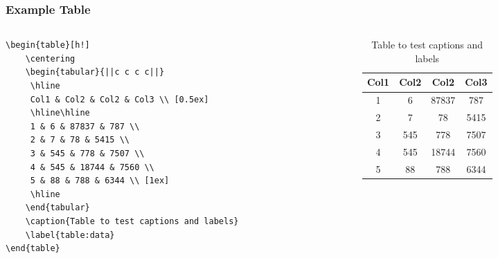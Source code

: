 \documentclass[aspectratio=169]{beamer}
\begin{document}
\begin{frame}[fragile]
\frametitle{Example Table}
    \begin{columns}
        \tiny
        \begin{column}{0.5\textwidth}
            \begin{verbatim}
\begin{table}[h!]
    \centering
    \begin{tabular}{||c c c c||} 
     \hline
     Col1 & Col2 & Col2 & Col3 \\ [0.5ex] 
     \hline\hline
     1 & 6 & 87837 & 787 \\ 
     2 & 7 & 78 & 5415 \\
     3 & 545 & 778 & 7507 \\
     4 & 545 & 18744 & 7560 \\
     5 & 88 & 788 & 6344 \\ [1ex] 
     \hline
    \end{tabular}
    \caption{Table to test captions and labels}
    \label{table:data}
\end{table}
            \end{verbatim}
        \end{column}
            
        \begin{column}{0.5\textwidth}

            \begin{table}[h!]
                \centering
                \begin{tabular}{||c c c c||} 
                 \hline
                 Col1 & Col2 & Col2 & Col3 \\ [0.5ex] 
                 \hline\hline
                 1 & 6 & 87837 & 787 \\ 
                 2 & 7 & 78 & 5415 \\
                 3 & 545 & 778 & 7507 \\
                 4 & 545 & 18744 & 7560 \\
                 5 & 88 & 788 & 6344 \\ [1ex] 
                 \hline
                \end{tabular}
                \caption{Table to test captions and labels}
                \label{table:data}
            \end{table}    
        \end{column}
        \normalsize
        
    \end{columns}

\end{frame}
\end{document}
